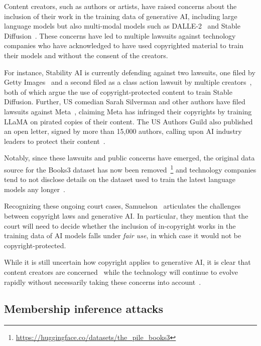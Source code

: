 \documentclass[twocolumn,10pt]{article}
\begin{document}
Content creators, such as authors or artists, have raised concerns about the inclusion of their work in the training data of generative AI, including large language models but also multi-modal models such as DALLE-2~\cite{ramesh2021zero} and Stable Diffusion~\cite{rombach2022high}. These concerns have led to multiple lawsuits against technology companies who have acknowledged to have used copyrighted material to train their models and without the consent of the creators.

For instance, Stability AI is currently defending against two lawsuits, one filed by Getty Images~\cite{gettystability} and a second filed as a class action lawsuit by multiple creators~\cite{classactionstability}, both of which argue the use of copyright-protected content to train Stable Diffusion. Further, US comedian Sarah Silverman and other authors have filed lawsuits against Meta~\cite{silvermanmeta}, claiming Meta has infringed their copyrights by training LLaMA on pirated copies of their content. The US Authors Guild also published an open letter, signed by more than 15,000 authors, calling upon AI industry leaders to protect their content~\cite{authorsguild}. 

Notably, since these lawsuits and public concerns have emerged, the original data source for the Books3 dataset has now been removed~\footnote{\url{https://huggingface.co/datasets/the_pile_books3}} and technology companies tend to not disclose details on the dataset used to train the latest language models any longer~\cite{touvron2023llama2}. 

Recognizing these ongoing court cases, Samuelson~\cite{samuelson2023generative} articulates the challenges between copyright laws and generative AI. In particular, they mention that the court will need to decide whether the inclusion of in-copyright works in the training data of AI models falls under \emph{fair use}, in which case it would not be copyright-protected. 

While it is still uncertain how copyright applies to generative AI, it is clear that content creators are concerned~\cite{authorsguild} while the technology will continue to evolve rapidly without necessarily taking these concerns into account~\cite{metacounterargument,openaicounterargument}. 

\subsection{Membership inference attacks}
\end{document}
